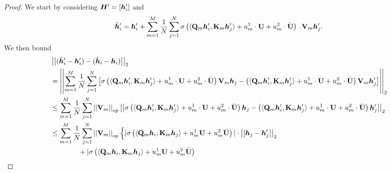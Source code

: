 \begin{proof}
    We start by considering $\bm{H}^\prime = [\bm{h}_i^\prime]$ and
    \begin{equation*}
        \tilde{\bm{h}}_i^\prime
        =
        \bm{h}^\prime_i
        +
        \sum_{m=1}^M
        \frac{1}{N}
        \sum_{j=1}^N
        \sigma
        \left(
        \langle
        \mathbf{Q}_m \bm{h}^\prime_i,
        \mathbf{K}_m \bm{h}^\prime_j
        \rangle
        +
        u^1_m \cdot \mathbf{U}
        +
        u^2_m \cdot \bar{\mathbf{U}}
        \right)
        \cdot 
        \mathbf{V}_m \bm{h}_j^\prime.
    \end{equation*}
    We then bound 
    \begin{align*}
        &\norm{ (\tilde{\bh}_i^\prime - \bh_i^\prime)
        -
        ( \tilde{\bh}_i - \bh_i )
        }_2
        \\
        &=
        \norm{
        \sum_{m=1}^M
        \frac{1}{N}
        \sum_{j=1}^N
        \left[
        \sigma
        \left(
        \langle
        \Qb_m \bh^\prime_i,
        \Kb_m \bh^\prime_j
        \rangle
        +
        u^1_m \cdot \Ub
        +
        u^2_m \cdot \bar{\Ub}
        \right)
        \Vb_m \bh_j
        -
        \left(
        \langle
        \Qb_m \bh^\prime_i,
        \Kb_m \bh^\prime_j
        \rangle
        +
        u^1_m \cdot \Ub
        +
        u^2_m \cdot \bar{\Ub}
        \right)
        \Vb_m \bh_j^\prime
        \right]
        }_2
        \\
        &\leq
        \sum_{m=1}^M
        \frac{1}{N}
        \sum_{j=1}^N
        \norm{\Vb_m}_{\text{op}}
        \norm{
        \sigma
        \left(
        \langle
        \Qb_m \bh^\prime_i,
        \Kb_m \bh^\prime_j
        \rangle
        +
        u^1_m \cdot \Ub
        +
        u^2_m \cdot \bar{\Ub}
        \right)
         \bh_j
        -
        \left(
        \langle
        \Qb_m \bh^\prime_i,
        \Kb_m \bh^\prime_j
        \rangle
        +
        u^1_m \cdot \Ub
        +
        u^2_m \cdot \bar{\Ub}
        \right)
        \bh_j^\prime
        }_2
        \\
        &\leq
        \sum_{m=1}^M 
        \frac{1}{N}
        \sum_{j=1}^N
        \norm{\Vb_m}_{\text{op}}
        \Big\{
        \vert 
        \sigma
        \left( \langle \Qb_m \bh_i, \Kb_m \bh_j \rangle + u^1_m \Ub + u^2_m \bar{\Ub} \right)
        \vert
        \cdot \norm{\bh_j - \bh_j^\prime}_2
        \\
        &\quad\quad\quad\quad+
        \vert
        \sigma
        \left( \langle \Qb_m \bh_i, \Kb_m \bh_j \rangle + u^1_m \Ub + u^2_m \bar{\Ub} \right)

\end{align*}
\end{proof}
